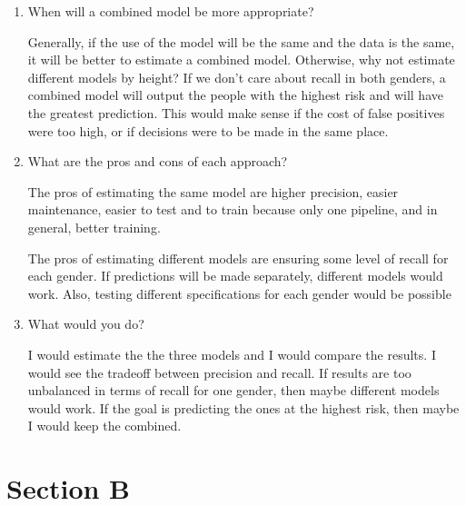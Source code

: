\documentclass[a4paper, 11pt]{article}
\begin{document}
\begin{enumerate}
\item When will a combined model be more appropriate?

Generally, if the use of the model will be the same and the data is the same, it will be better to estimate a combined model. Otherwise, why not estimate different models by height? If we don't care about recall in both genders, a combined model will output the people with the highest risk and will have the greatest prediction. This would make sense if the cost of false positives were too high, or if decisions were to be made in the same place.
\item What are the pros and cons of each approach?

The pros of estimating the same model are higher precision, easier maintenance, easier to test and to train because only one pipeline, and in general, better training. 

The pros of estimating different models are ensuring some level of recall for each gender. If predictions will be made separately, different models would work. Also, testing different specifications for each gender would be possible

\item What would you do?

I would estimate the the three models and I would compare the results. I would see the tradeoff between precision and recall. If results are too unbalanced in terms of recall for one gender, then maybe different models would work. If the goal is predicting the ones at the highest risk, then maybe I would keep the combined.
\end{enumerate}

\section*{Section B}
\end{document}
